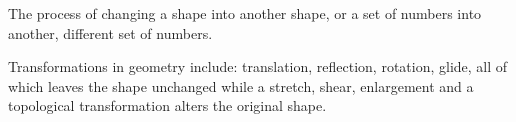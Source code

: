The process of changing a shape into another shape, or a 
set of numbers into another, different set of numbers.
 
\par
Transformations in geometry include: translation, reflection, rotation, glide, all of 
which leaves the shape unchanged while a stretch, shear, enlargement and a topological 
transformation alters the original shape.